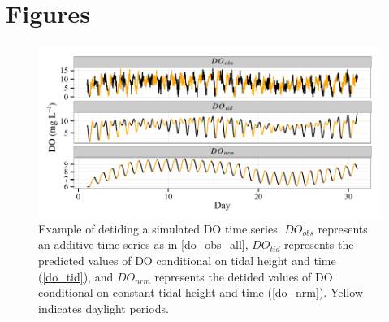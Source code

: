 \documentclass[letterpaper,12pt,oneside]{article}\usepackage[]{graphicx}\usepackage[]{color}
\makeatletter
\def\maxwidth{ %
  \ifdim\Gin@nat@width>\linewidth
    \linewidth
  \else
    \Gin@nat@width
  \fi
}
\newenvironment{knitrout}{}{} %
\makeatother
\begin{document}
\begin{singlespace}


\end{singlespace}
\clearpage


\section{Figures}

\centering\vspace*{\fill}
\begin{knitrout}
\color{fgcolor}\begin{figure}[!ht]


{\centering \includegraphics[width=\maxwidth]{figure/do_dtd} 

}

\caption[Example of detiding a simulated \ac{DO} time series]{Example of detiding a simulated \ac{DO} time series.  $DO_{obs}$ represents an additive time series as in \cref{do_obs_all}, $DO_{tid}$ represents the predicted values of \ac{DO} conditional on tidal height and time (\cref{do_tid}), and $DO_{nrm}$ represents the detided values of \ac{DO} conditional on constant tidal height and time (\cref{do_nrm}).  Yellow indicates daylight periods.\label{fig:do_dtd}}
\end{figure}


\end{knitrout}
\vfill
\clearpage
\end{document}

